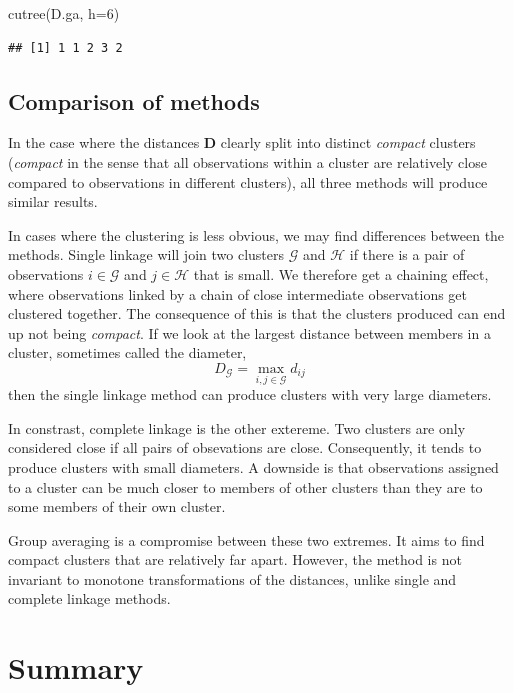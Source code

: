 \documentclass[
]{book}
\newenvironment{Shaded}{\begin{snugshade}}{\end{snugshade}}
\newcommand{\AttributeTok}[1]{\textcolor[rgb]{0.77,0.63,0.00}{#1}}
\newcommand{\DecValTok}[1]{\textcolor[rgb]{0.00,0.00,0.81}{#1}}
\newcommand{\FunctionTok}[1]{\textcolor[rgb]{0.00,0.00,0.00}{#1}}
\newcommand{\NormalTok}[1]{#1}
\theoremstyle{definition}
\theoremstyle{definition}
\theoremstyle{definition}
\theoremstyle{definition}
\theoremstyle{remark}
\begin{document}
\begin{Shaded}
\begin{Highlighting}[]
\FunctionTok{cutree}\NormalTok{(D.ga, }\AttributeTok{h=}\DecValTok{6}\NormalTok{)}
\end{Highlighting}
\end{Shaded}

\begin{verbatim}
## [1] 1 1 2 3 2
\end{verbatim}

\hypertarget{comparison-of-methods}{%
\subsection{Comparison of methods}\label{comparison-of-methods}}

In the case where the distances \(\mathbf D\) clearly split into distinct \emph{compact} clusters (\emph{compact} in the sense that all observations within a cluster are relatively close compared to observations in different clusters), all three methods will produce similar results.

In cases where the clustering is less obvious, we may find differences between the methods. Single linkage will join two clusters \(\mathcal{G}\) and \(\mathcal{H}\) if there is a pair of observations \(i\in \mathcal{G}\) and \(j \in \mathcal{H}\) that is small. We therefore get a chaining effect, where observations linked by a chain of close intermediate observations get clustered together. The consequence of this is that the clusters produced can end up not being \emph{compact}. If we look at the largest distance between members in a cluster, sometimes called the diameter,
\[D_\mathcal{G}= \max_{i,j \in \mathcal{G}} d_{ij}\]
then the single linkage method can produce clusters with very large diameters.

In constrast, complete linkage is the other extereme. Two clusters are only considered close if all pairs of obsevations are close. Consequently, it tends to produce clusters with small diameters. A downside is that observations assigned to a cluster can be much closer to members of other clusters than they are to some members of their own cluster.

Group averaging is a compromise between these two extremes. It aims to find compact clusters that are relatively far apart. However, the method is not invariant to monotone transformations of the distances, unlike single and complete linkage methods.

\hypertarget{summary}{%
\section{Summary}\label{summary}}
\end{document}
